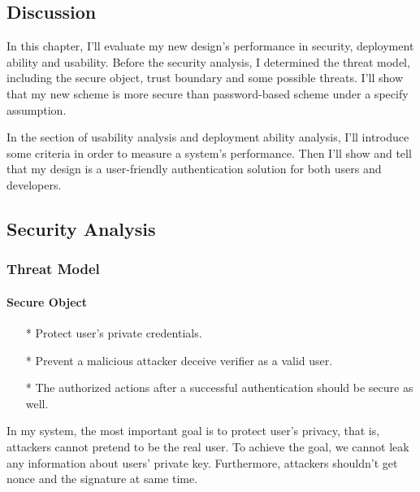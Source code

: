 \begin{CJK}{Bg5}{bsmi}


\chapter{Discussion}

In this chapter, I'll evaluate my new design's performance in security, deployment ability and usability. Before the security analysis, I determined the threat model\cite{threat-model}, including the secure object, trust boundary and some possible threats. I'll show that my new scheme is more secure than password-based scheme under a specify assumption.

In the section of usability analysis and deployment ability analysis, I'll introduce some criteria in order to measure a system's performance. Then I'll show and tell that my design is a user-friendly authentication solution for both users and developers.

\section{Security Analysis}

\subsection{Threat Model}

\subsubsection{Secure Object}

\begin{enumerate}
\item[*] Protect user's private credentials.
\item[*] Prevent a malicious attacker deceive verifier as a valid user.
\\
\item[*] The authorized actions after a successful authentication should be secure as well.
\end{enumerate}

In my system, the most important goal is to protect user's privacy, that is, attackers cannot pretend to be the real user. To achieve the goal, we cannot leak any information about users' private key. Furthermore, attackers shouldn't get nonce and the signature at same time.


\end{CJK}
